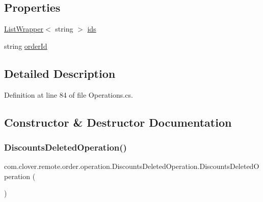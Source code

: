 \subsection*{Properties}
\begin{DoxyCompactItemize}
\item 
\hyperlink{classcom_1_1clover_1_1remote_1_1order_1_1_list_wrapper}{List\+Wrapper}$<$ string $>$ \hyperlink{classcom_1_1clover_1_1remote_1_1order_1_1operation_1_1_discounts_deleted_operation_a1f1502d15ad11c5ecc83cf3bd78c3c11}{ids}
\item 
string \hyperlink{classcom_1_1clover_1_1remote_1_1order_1_1operation_1_1_discounts_deleted_operation_a0a18d8ad82ea9ac7aa64f5338bb624d8}{order\+Id}
\end{DoxyCompactItemize}


\subsection{Detailed Description}


Definition at line 84 of file Operations.\+cs.



\subsection{Constructor \& Destructor Documentation}
\mbox{\label{classcom_1_1clover_1_1remote_1_1order_1_1operation_1_1_discounts_deleted_operation_ae3a0f29f218a53da8a4b2973a67837e8}} 
\subsubsection{\texorpdfstring{Discounts\+Deleted\+Operation()}{DiscountsDeletedOperation()}\hspace{0.1cm}{\footnotesize\ttfamily [1/2]}}
{\footnotesize\ttfamily com.\+clover.\+remote.\+order.\+operation.\+Discounts\+Deleted\+Operation.\+Discounts\+Deleted\+Operation (\begin{DoxyParamCaption}{ }\end{DoxyParamCaption})}



